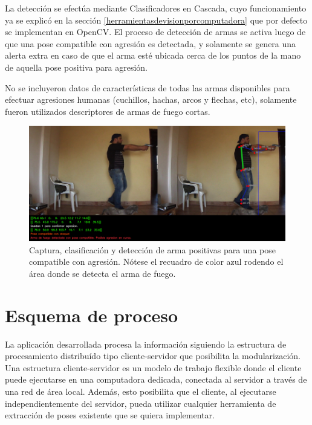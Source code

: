 \documentclass[a4paper,12pt,oneside,spanish]{book}
\begin{document}
La detección se efectúa mediante Clasificadores en Cascada, cuyo funcionamiento ya se explicó en la sección \ref{herramientasdevisionporcomputadora} que por defecto se implementan en OpenCV. El proceso de detección de armas se activa luego de que una pose compatible con agresión es detectada, y solamente se genera una alerta extra en caso de que el arma esté ubicada cerca de los puntos de la mano de aquella pose positiva para agresión.\par

No se incluyeron datos de características de todas las armas disponibles para efectuar agresiones humanas (cuchillos, hachas, arcos y flechas, etc), solamente fueron utilizados descriptores de armas de fuego cortas.\par

\vspace*{1cm}

\begin{figure}[h!]
	\includegraphics[width=450pt]{Imagenes/positiveresult.jpg}
	\centering	
	\caption{Captura, clasificación y detección de arma positivas para una pose compatible con agresión. Nótese el recuadro de color azul rodendo el área donde se detecta el arma de fuego.}
	\label{fig:code1}
\end{figure}

\section{Esquema de proceso}\label{processschema}
La aplicación desarrollada procesa la información siguiendo la estructura de procesamiento distribuído tipo cliente-servidor que posibilita la modularización. Una estructura cliente-servidor es un modelo de trabajo flexible donde el cliente puede ejecutarse en una computadora dedicada, conectada al servidor a través de una red de área local. Además, esto posibilita que el cliente, al ejecutarse independientemente del servidor, pueda utilizar cualquier herramienta de extracción de poses existente que se quiera implementar. \par
\end{document}
